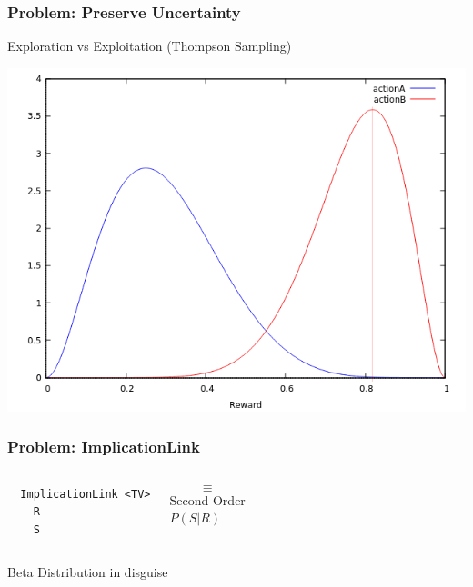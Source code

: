 \documentclass{beamer}
\begin{document}
\begin{frame}[fragile]
  \frametitle{Problem: Preserve Uncertainty}

  Exploration vs Exploitation (Thompson Sampling)

  \begin{center}
    \includegraphics[scale=0.55]{images/ActionA_ActionB_lines_alpha.png}
  \end{center}
\end{frame}

\begin{frame}[fragile]
  \frametitle{Problem: ImplicationLink}

\begin{columns}
\column{1.5in}

{\small
\begin{verbatim}
  ImplicationLink <TV>
    R
    S
\end{verbatim}
}

\column{1in}
$$\equiv$$
\column{1.5in}
Second Order\\
$P(S|R)$
\end{columns}

\begin{center}\alert{Beta Distribution} in disguise\end{center}

\end{frame}
\end{document}
